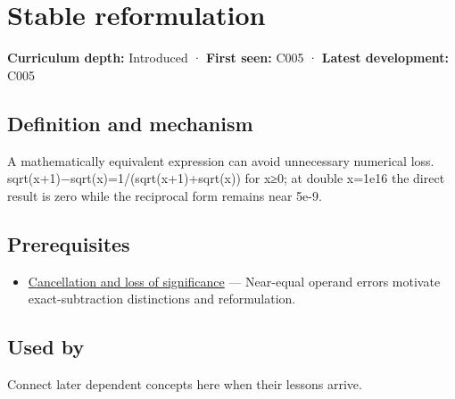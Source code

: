 \hypertarget{appendix-d7f8ba961670}{}\label{referencestart:appendix-d7f8ba961670}
\section{Stable reformulation}\label{appendix-d7f8ba961670-stable-reformulation}

\hypertarget{appendix-d7f8ba961670-stable-reformulation}{}

\textbf{Curriculum depth:} Introduced · \textbf{First seen:} C005 · \textbf{Latest development:} C005

\begin{allmightroledefinition}

\subsection{Definition and mechanism}\label{appendix-d7f8ba961670-definition-and-mechanism}

\hypertarget{appendix-d7f8ba961670-definition-and-mechanism}{}

A mathematically equivalent expression can avoid unnecessary numerical loss. sqrt(x+1)−sqrt(x)=1/(sqrt(x+1)+sqrt(x)) for x≥0; at double x=1e16 the direct result is zero while the reciprocal form remains near 5e-9.

\end{allmightroledefinition}

\subsection{Prerequisites}\label{appendix-d7f8ba961670-prerequisites}

\hypertarget{appendix-d7f8ba961670-prerequisites}{}

\begin{itemize}
\tightlist
\item
  \hyperref[appendix-a2773a6a2f9d]{Cancellation and loss of significance} --- Near-equal operand errors motivate exact-subtraction distinctions and reformulation.
\end{itemize}

\subsection{Used by}\label{appendix-d7f8ba961670-used-by}

\hypertarget{appendix-d7f8ba961670-used-by}{}

Connect later dependent concepts here when their lessons arrive.

